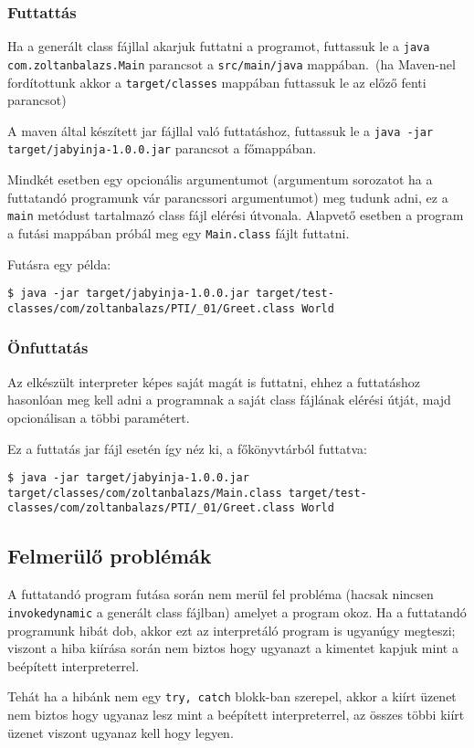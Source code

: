 \subsubsection{Futtattás}

Ha a generált class fájllal akarjuk futtatni a programot, futtassuk le a \lstinline{java com.zoltanbalazs.Main} parancsot a \lstinline{src/main/java} mappában.\ (ha Maven-nel fordítottunk akkor a \lstinline{target/classes} mappában futtassuk le az előző fenti parancsot)

A maven által készített jar fájllal való futtatáshoz, futtassuk le a \lstinline{java -jar target/jabyinja-1.0.0.jar} parancsot a főmappában.

Mindkét esetben egy opcionális argumentumot (argumentum sorozatot ha a futtatandó programunk vár parancssori argumentumot) meg tudunk adni, ez a \lstinline{main} metódust tartalmazó class fájl elérési útvonala. Alapvető esetben a program a futási mappában próbál meg egy \lstinline{Main.class} fájlt futtatni.

Futásra egy példa:
\begin{verbatim}
$ java -jar target/jabyinja-1.0.0.jar target/test-classes/com/zoltanbalazs/PTI/_01/Greet.class World
\end{verbatim}

\subsubsection{Önfuttatás}

Az elkészült interpreter képes saját magát is futtatni, ehhez a futtatáshoz hasonlóan meg kell adni a programnak a saját class fájlának elérési útját, majd opcionálisan a többi paramétert.

Ez a futtatás jar fájl esetén így néz ki, a főkönyvtárból futtatva:
\begin{verbatim}
$ java -jar target/jabyinja-1.0.0.jar target/classes/com/zoltanbalazs/Main.class target/test-classes/com/zoltanbalazs/PTI/_01/Greet.class World
\end{verbatim}

\subsection{Felmerülő problémák}

A futtatandó program futása során nem merül fel probléma (hacsak nincsen \lstinline{invokedynamic} a generált class fájlban) amelyet a program okoz. Ha a futtatandó programunk hibát dob, akkor ezt az interpretáló program is ugyanúgy megteszi; viszont a hiba kiírása során nem biztos hogy ugyanazt a kimentet kapjuk mint a beépített interpreterrel.

Tehát ha a hibánk nem egy \lstinline{try, catch} blokk-ban szerepel, akkor a kiírt üzenet nem biztos hogy ugyanaz lesz mint a beépített interpreterrel, az összes többi kiírt üzenet viszont ugyanaz kell hogy legyen.